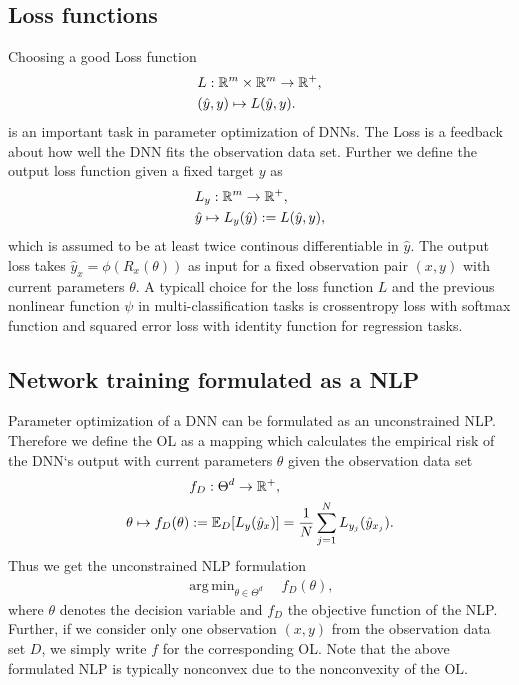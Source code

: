 \documentclass[conference]{IEEEtran}
\DeclareMathOperator*{\argmin}{arg\,min}
\begin{document}
\subsection{Loss functions}
\noindent
Choosing a good Loss function
\begin{align}
&L:\mathbb{R}^{m}\times \mathbb{R}^{m}\rightarrow \mathbb{R}^{+}, \notag\\
&(\hat{y}, y)\mapsto L(\hat{y}, y). 
\end{align}
is an important task in parameter optimization of DNNs. The Loss is a feedback about how well the DNN fits the observation data set. Further we define the output loss function given a fixed target $y$ as
\begin{align}
&L_{y}:\mathbb{R}^{m}\rightarrow \mathbb{R}^{+}, \notag\\
&\hat{y}\mapsto L_{y}(\hat{y}) := L(\hat{y}, y), 
\end{align}
which is assumed to be at least twice continous differentiable in $\hat{y}$. The output loss takes $\hat{y}_{x} = \phi(R_{x}(\theta))$ as input for a fixed observation pair $(x, y)$ with current parameters $\theta$. A typicall choice for the loss function $L$ and the previous nonlinear function $\psi$ in multi-classification tasks is crossentropy loss with softmax function and squared error loss with identity function for regression tasks.



\subsection{Network training formulated as a NLP}
\noindent
Parameter optimization of a DNN can be formulated as an unconstrained NLP. Therefore we define the OL as a mapping which calculates the empirical risk of the DNN`s output with current parameters $\theta$ given the observation data set
\begin{align}
&f_{D}:\Theta^{d}\rightarrow\mathbb{R}^{+}, \notag\\
\theta\mapsto f_{D}(\theta) &:= \mathbb{E}_{D}[L_{y}(\hat{y}_{x})] =  \frac{1}{N}\sum_{j = 1}^{N}L_{y_{j}}(\hat{y}_{x_{j}}).
\end{align}
Thus we get the unconstrained NLP formulation
\begin{align}
\argmin_{\theta\in\Theta^{d}}\quad f_{D}(\theta),
\end{align}
where $\theta$ denotes the decision variable and $f_{D}$ the objective function of the NLP.
Further, if we consider only one observation $(x, y)$ from the observation data set $D$, we simply write  $f$ for the corresponding OL. Note that the above formulated NLP is typically nonconvex due to the nonconvexity of the OL.
\end{document}
